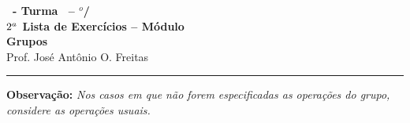 \documentclass[12pt]{exam}
\begin{document}
    \begin{center}
    {\Large\bf \disciplina\ - Turma \turma\ -- \semestre$^{o}$/\ano} \\ \vspace{9pt} {\large\bf
        $2^a$ Lista de Exercícios -- Módulo \numeromodulo\\ Grupos}\\ \vspace{9pt} Prof. José Antônio O. Freitas
    \end{center}
    \hrule

    \vspace{.6cm}

    \textbf{Observação: }\textit{Nos casos em que não forem especificadas as operações do grupo, considere as operações usuais.}

    \vspace{.6cm}








\end{document}
